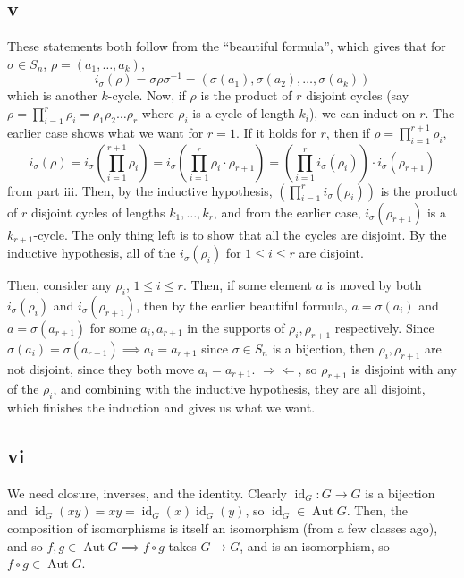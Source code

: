 \documentclass[12pt,letterpaper]{article}
\theoremstyle{definition}
\newcommand{\contra}{\Rightarrow\!\Leftarrow}
\DeclareMathOperator{\Id}{id}
\DeclareMathOperator{\Aut}{Aut}
\begin{document}
\subsection*{v}

These statements both follow from the ``beautiful formula'', which gives that for $\sigma \in S_{n}$, $\rho = (a_{1}, \dots, a_{k})$,
\[
  i_{\sigma}(\rho) = \sigma \rho \sigma^{-1} = (\sigma(a_{1}), \sigma(a_{2}), \dots, \sigma(a_{k}))
\]
which is another $k$-cycle. Now, if $\rho$ is the product of $r$ disjoint cycles (say $\rho = \prod_{i=1}^{r}\rho_{i} = \rho_{1}\rho_{2}\dots\rho_{r}$ where $\rho_{i}$ is a cycle of length $k_{i}$), we can induct on $r$. The earlier case shows what we want for $r = 1$. If it holds for $r$, then if $\rho = \prod_{i=1}^{r+1}\rho_{i}$,
\[
  i_{\sigma}(\rho) = i_{\sigma}\left(\prod_{i=1}^{r+1}\rho_{i}\right) = i_{\sigma}\left(\prod_{i=1}^{r}\rho_{i} \cdot \rho_{r+1}\right) = \left(\prod_{i=1}^{r}i_{\sigma}(\rho_{i})\right) \cdot i_{\sigma}(\rho_{r+1})
\]
from part iii. Then, by the inductive hypothesis, $\left(\prod_{i=1}^{r}i_{\sigma}(\rho_{i})\right)$ is the product of $r$ disjoint cycles of lengths $k_{1}, \dots, k_{r}$, and from the earlier case, $i_{\sigma}(\rho_{r+1})$ is a $k_{r+1}$-cycle. The only thing left is to show that all the cycles are disjoint. By the inductive hypothesis, all of the $i_{\sigma}(\rho_{i})$ for $1 \leq i \leq r$ are disjoint.

Then, consider any $\rho_{i}$, $1 \leq i \leq r$. Then, if some element $a$ is moved by both $i_{\sigma}(\rho_{i})$ and $i_{\sigma}(\rho_{r+1})$, then by the earlier beautiful formula, $a = \sigma(a_{i})$ and $a = \sigma(a_{r+1})$ for some $a_{i}, a_{r+1}$ in the supports of $\rho_{i}, \rho_{r+1}$ respectively. Since $\sigma(a_{i}) = \sigma(a_{r+1}) \implies a_{i} = a_{r+1}$ since $\sigma \in S_{n}$ is a bijection, then $\rho_{i}, \rho_{r+1}$ are not disjoint, since they both move $a_{i} = a_{r+1}$. $\contra$, so $\rho_{r+1}$ is disjoint with any of the $\rho_{i}$, and combining with the inductive hypothesis, they are all disjoint, which finishes the induction and gives us what we want.

\subsection*{vi}

We need closure, inverses, and the identity. Clearly $\Id_{G}: G \rightarrow G$ is a bijection and $\Id_{G}(xy) = xy = \Id_{G}(x)\Id_{G}(y)$, so $\Id_{G} \in \Aut G$. Then, the composition of isomorphisms is itself an isomorphism (from a few classes ago), and so $f, g \in \Aut G \implies f\circ g$ takes $G \rightarrow G$, and is an isomorphism, so $f \circ g \in \Aut G$.
\end{document}
